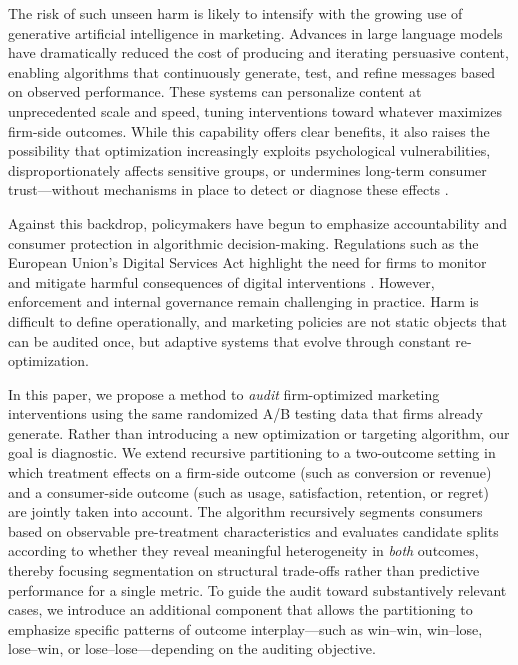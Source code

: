 \documentclass[11pt,letterpaper,english]{article}
\theoremstyle{definition}
\theoremstyle{definition}
\begin{document}
\begin{bibunit}
The risk of such unseen harm is likely to intensify with the growing use of generative artificial intelligence in marketing. Advances in large language models have dramatically reduced the cost of producing and iterating persuasive content, enabling algorithms that continuously generate, test, and refine messages based on observed performance. These systems can personalize content at unprecedented scale and speed, tuning interventions toward whatever maximizes firm-side outcomes. While this capability offers clear benefits, it also raises the possibility that optimization increasingly exploits psychological vulnerabilities, disproportionately affects sensitive groups, or undermines long-term consumer trust—without mechanisms in place to detect or diagnose these effects \citep{helberger2020choice}.

Against this backdrop, policymakers have begun to emphasize accountability and consumer protection in algorithmic decision-making. Regulations such as the European Union’s Digital Services Act highlight the need for firms to monitor and mitigate harmful consequences of digital interventions \citep{dsa2022article34}. However, enforcement and internal governance remain challenging in practice. Harm is difficult to define operationally, and marketing policies are not static objects that can be audited once, but adaptive systems that evolve through constant re-optimization.

In this paper, we propose a method to \emph{audit} firm-optimized marketing interventions using the same randomized A/B testing data that firms already generate. Rather than introducing a new optimization or targeting algorithm, our goal is diagnostic. We extend recursive partitioning to a two-outcome setting in which treatment effects on a firm-side outcome (such as conversion or revenue) and a consumer-side outcome (such as usage, satisfaction, retention, or regret) are jointly taken into account. The algorithm recursively segments consumers based on observable pre-treatment characteristics and evaluates candidate splits according to whether they reveal meaningful heterogeneity in \emph{both} outcomes, thereby focusing segmentation on structural trade-offs rather than predictive performance for a single metric. To guide the audit toward substantively relevant cases, we introduce an additional component that allows the partitioning to emphasize specific patterns of outcome interplay—such as win--win, win--lose, lose--win, or lose--lose—depending on the auditing objective.


\end{bibunit}
\end{document}
